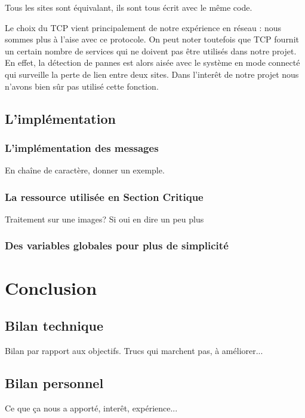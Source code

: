 \documentclass[a4paper,12pt]{article}
\begin{document}


Tous les sites sont équivalant, ils sont tous écrit avec le même code.

Le choix du TCP vient principalement de notre expérience en réseau : nous sommes plus à l'aise avec ce protocole. 
On peut noter toutefois que TCP fournit un certain nombre de services qui ne doivent pas être utilisés dans notre projet. En effet, la détection de pannes est alors aisée avec le système en mode connecté qui surveille la perte de lien entre deux sites. Dans l'interêt de notre projet nous n'avons bien sûr pas utilisé cette fonction.

\subsection{L'implémentation}

\subsubsection{L'implémentation des messages}
En chaîne de caractère, donner un exemple.
\subsubsection{La ressource utilisée en Section Critique}
Traitement sur une images? Si oui en dire un peu plus
\subsubsection{Des variables globales pour plus de simplicité}



\section{Conclusion}

\subsection{Bilan technique}
Bilan par rapport aux objectifs.
Trucs qui marchent pas, à améliorer...

\subsection{Bilan personnel}
Ce que ça nous a apporté, interêt, expérience...


\end{document}
